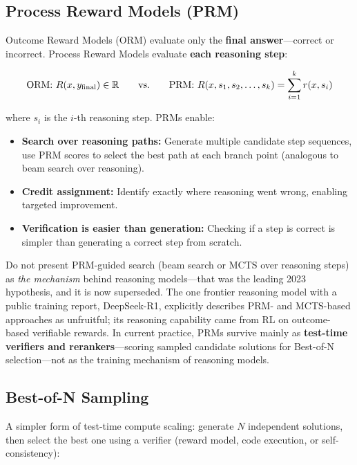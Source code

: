 \subsection{Process Reward Models (PRM)}

Outcome Reward Models (ORM) evaluate only the \textbf{final answer}---correct
or incorrect.  Process Reward Models evaluate \textbf{each reasoning step}:

\begin{equation}
\text{ORM: } R(x, y_{\text{final}}) \in \mathbb{R}
\qquad\text{vs.}\qquad
\text{PRM: } R(x, s_1, s_2, \ldots, s_k) = \sum_{i=1}^{k} r(x, s_i)
\label{eq:prm}
\end{equation}

where $s_i$ is the $i$-th reasoning step.  PRMs enable:
\begin{itemize}[leftmargin=*]
\item \textbf{Search over reasoning paths:} Generate multiple candidate
  step sequences, use PRM scores to select the best path at each branch
  point (analogous to beam search over reasoning).
\item \textbf{Credit assignment:} Identify exactly where reasoning went
  wrong, enabling targeted improvement.
\item \textbf{Verification is easier than generation:} Checking if a step
  is correct is simpler than generating a correct step from scratch.
\end{itemize}

\begin{warningbox}
Do not present PRM-guided search (beam search or MCTS over reasoning steps)
as \emph{the mechanism} behind reasoning models---that was the leading 2023
hypothesis, and it is now superseded.  The one frontier reasoning model with
a public training report, DeepSeek-R1, explicitly describes PRM- and
MCTS-based approaches as unfruitful; its reasoning capability came from RL
on outcome-based verifiable rewards.  In current practice, PRMs survive
mainly as \textbf{test-time verifiers and rerankers}---scoring sampled
candidate solutions for Best-of-N selection---not as the training mechanism
of reasoning models.
\end{warningbox}

\subsection{Best-of-N Sampling}

A simpler form of test-time compute scaling: generate $N$ independent
solutions, then select the best one using a verifier (reward model, code
execution, or self-consistency):


